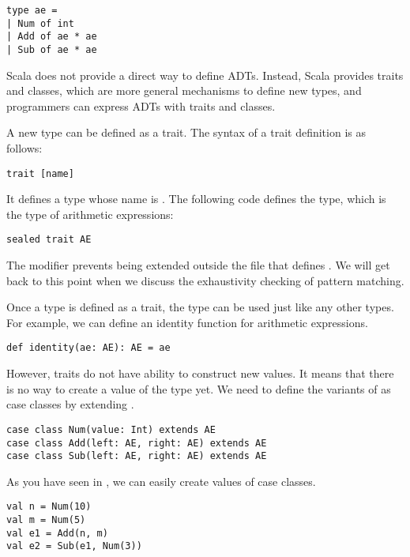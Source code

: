 \begin{verbatim}
type ae =
| Num of int
| Add of ae * ae
| Sub of ae * ae
\end{verbatim}

Scala does not provide a direct way to define ADTs. Instead, Scala provides
traits and classes, which are more general mechanisms to define new types,
and programmers can express ADTs with traits and classes.

A new type can be defined as a trait.
The syntax of a trait definition is as follows:

\begin{verbatim}
trait [name]
\end{verbatim}

It defines a type whose name is \code{[name]}.
The following code defines the  type,
which is the type of arithmetic expressions:

\begin{verbatim}
sealed trait AE
\end{verbatim}

The  modifier prevents  being extended outside the file
that defines . We will get back to this point when we discuss the
exhaustivity checking of pattern matching.

Once a type is defined as a trait, the type can be used just like any other
types. For example, we can define an identity function for arithmetic
expressions.

\begin{verbatim}
def identity(ae: AE): AE = ae
\end{verbatim}

However, traits do not have ability to construct new values. It means that there
is no way to create a value of the type  yet. We need to define the
variants of  as case classes by extending .

\begin{verbatim}
case class Num(value: Int) extends AE
case class Add(left: AE, right: AE) extends AE
case class Sub(left: AE, right: AE) extends AE
\end{verbatim}

As you have seen in , we can easily create values of case classes.

\begin{verbatim}
val n = Num(10)
val m = Num(5)
val e1 = Add(n, m)
val e2 = Sub(e1, Num(3))
\end{verbatim}


